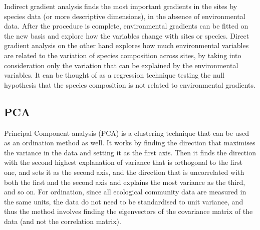 Indirect gradient analysis finds the most important gradients in the sites by species data (or more descriptive dimensions), in the absence of environmental data. After the procedure is complete, environmental gradients can be fitted on the new basis and explore how the variables change with sites or species. Direct gradient analysis on the other hand explores how much environmental variables are related to the variation of species composition across sites, by taking into consideration only the variation that can be explained by the environmental variables. It can be thought of as a regression technique testing the null hypothesis that the species composition is not related to environmental gradients.

\subsection{PCA}
\label{ssec:PCA}
Principal Component analysis (PCA) is a clustering technique that can be used as an ordination method as well. It works by finding the direction that maximises the variance in the data and setting it as the first axis. Then it finds the direction with the second highest explanation of variance that is orthogonal to the first one, and sets it as the second axis, and the direction that is uncorrelated with both the first and the second axis and explains the most variance as the third, and so on. For ordination, since all ecological community data are measured in the same units, the data do not need to be standardised to unit variance, and thus the method involves finding the eigenvectors of the covariance matrix of the data (and not the correlation matrix).

